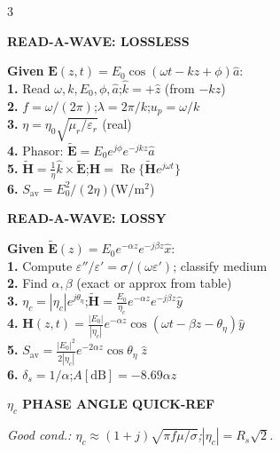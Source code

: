 \documentclass[6pt,letterpaper]{article}
\newcommand{\shead}[3]{%
  \noindent\colorbox{#1}{\parbox{\dimexpr\linewidth-2\fboxsep\relax}%
  {\color{#2}\bfseries\fontsize{6}{7}\selectfont #3}}\vspace{0.5pt}}
\begin{document}
\begin{multicols}{3}
\columnbreak

\shead{graybg}{gray}{READ-A-WAVE: LOSSLESS}
\begin{ebox}
\textbf{Given} $\mathbf{E}(z,t)=E_0\cos(\omega t-kz+\phi)\hat{a}$:\\[0.5pt]
\textbf{1.} Read $\omega,k,E_0,\phi,\hat{a}$;\enspace$\hat{k}=+\hat{z}$ (from $-kz$)\\
\textbf{2.} $f=\omega/(2\pi)$;\enspace$\lambda=2\pi/k$;\enspace$u_p=\omega/k$\\
\textbf{3.} $\eta=\eta_0\sqrt{\mu_r/\varepsilon_r}$ (real)\\
\textbf{4.} Phasor: $\tilde{\mathbf{E}}=E_0e^{j\phi}e^{-jkz}\hat{a}$\\
\textbf{5.} $\tilde{\mathbf{H}}=\frac{1}{\eta}\hat{k}\times\tilde{\mathbf{E}}$;\enspace$\mathbf{H}=\operatorname{Re}\{\tilde{\mathbf{H}}e^{j\omega t}\}$\\
\textbf{6.} $S_\text{av}=E_0^2/(2\eta)$\;(W/m$^2$)
\end{ebox}

\vspace{0.3pt}
\shead{graybg}{gray}{READ-A-WAVE: LOSSY}
\begin{ebox}
\textbf{Given} $\tilde{\mathbf{E}}(z)=E_0e^{-\alpha z}e^{-j\beta z}\hat{x}$:\\[0.5pt]
\textbf{1.} Compute $\varepsilon''/\varepsilon'=\sigma/(\omega\varepsilon')$; classify medium\\
\textbf{2.} Find $\alpha,\beta$ (exact or approx from table)\\
\textbf{3.} $\eta_c=|\eta_c|e^{j\theta_\eta}$;\enspace$\tilde{\mathbf{H}}=\frac{E_0}{\eta_c}e^{-\alpha z}e^{-j\beta z}\hat{y}$\\
\textbf{4.} $\mathbf{H}(z,t)=\frac{|E_0|}{|\eta_c|}e^{-\alpha z}\cos(\omega t-\beta z-\theta_\eta)\hat{y}$\\
\textbf{5.} $S_\text{av}=\frac{|E_0|^2}{2|\eta_c|}e^{-2\alpha z}\cos\theta_\eta\;\hat{z}$\\
\textbf{6.} $\delta_s=1/\alpha$;\enspace$A[\text{dB}]=-8.69\alpha z$
\end{ebox}

\vspace{0.3pt}
\shead{coralbg}{coral}{$\eta_c$ PHASE ANGLE QUICK-REF}
\begin{ebox}
{\centering{}\par}
\textit{Good cond.: $\eta_c\approx(1+j)\sqrt{\pi f\mu/\sigma}$;\enspace$|\eta_c|=R_s\sqrt{2}$.}
\end{ebox}

\end{multicols}
\end{document}
